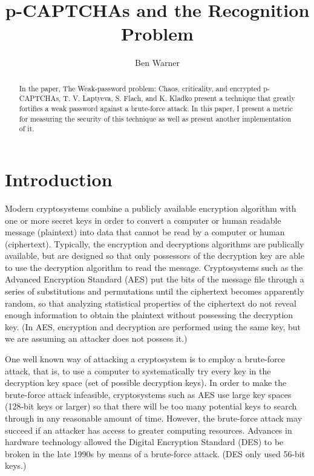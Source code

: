\documentclass[12pt]{article}
\begin{document}
\title{p-CAPTCHAs and the Recognition Problem}
\author{Ben Warner}
\maketitle

\begin{abstract}
In the paper, The Weak-password problem: Chaos, criticality, and encrypted p-CAPTCHAs, T. V. Laptyeva, S. Flach, and K. Kladko present a technique that greatly fortifies a weak password against a brute-force attack. In this paper, I present a metric for measuring the security of this technique as well as present another implementation of it.
\end{abstract}

\section*{Introduction}
Modern cryptosystems combine a publicly available encryption algorithm with one or more secret keys in order to convert a computer or human readable message (plaintext) into data that cannot be read by a computer or human (ciphertext). Typically, the encryption and decryptions algorithms are publically available, but are designed so that only possessors of the decryption key are able to use the decryption algorithm to read the message. Cryptosystems such as the Advanced Encryption Standard (AES) put the bits of the message file through a series of substitutions and permutations until the ciphertext becomes apparently random, so that analyzing statistical properties of the ciphertext do not reveal enough information to obtain the plaintext without possessing the decryption key. (In AES, encryption and decryption are performed using the same key, but we are assuming an attacker does not possess it.)

One well known way of attacking a cryptosystem is to employ a brute-force attack, that is, to use a computer to systematically try every key in the decryption key space (set of possible decryption keys). In order to make the brute-force attack infeasible, cryptosystems such as AES use large key spaces (128-bit keys or larger) so that there will be too many potential keys to search through in any reasonable amount of time. However, the brute-force attack may succeed if an attacker has access to greater computing resources. Advances in hardware technology allowed the Digital Encryption Standard (DES) to be broken in the late 1990s by means of a brute-force attack. (DES only used 56-bit keys.)
\end{document}

